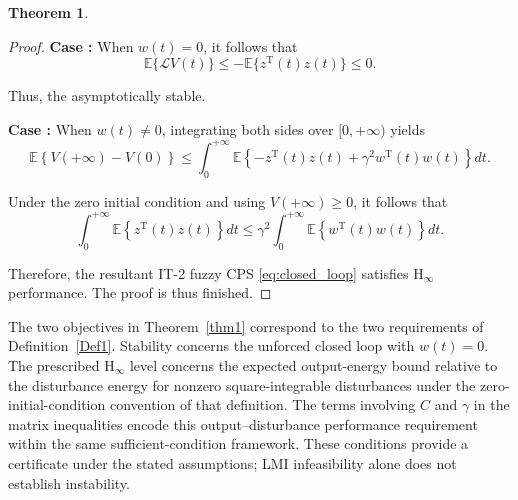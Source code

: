 \documentclass[preprint,review,fleqn,sort&compress,3p]{elsarticle}
\theoremstyle{definition} %
\theoremstyle{definition}%
\newtheorem{thm}{Theorem}[section]
\newif\ifreviewmarkup
\DeclareRobustCommand{\revdel}[1]{\ifreviewmarkup{\color{revisionred}\hypersetup{linkcolor=revisionred,citecolor=revisionred}#1}\fi}
\DeclareRobustCommand{\revadd}[1]{{\ifreviewmarkup\color{revisiongreen}\hypersetup{linkcolor=revisiongreen,citecolor=revisiongreen}\fi#1}}
\begin{document}
\begin{thm}
\begin{proof}
\textbf{Case \uppercase\expandafter{}:} When $w(t)=0$, it follows that
\begin{equation}
	\mathbb{E}\{\mathcal{L}V(t)\}
	\leq
	-\mathbb{E}\{z^{\mathrm{T}}(t)z(t)\}
	\leq 0.
\end{equation}

\label{rev:M31}Thus, the \revdel{closed-loop IT-2 fuzzy CPSs \eqref{eq:closed_loop} is} asymptotically stable.

\textbf{Case \uppercase\expandafter{}:} When $w(t)\neq0$, integrating both sides over $[0,+\infty)$ yields
\begin{equation}
	\mathbb{E}\left\{V(+\infty)-V(0)\right\}
	\leq
	\int_{0}^{+\infty}
	\mathbb{E}\left\{
	-z^{\mathrm{T}}(t)z(t)
	+\gamma^2 w^{\mathrm{T}}(t)w(t)
	\right\}dt.
\end{equation}

Under the zero initial condition and using $V(+\infty)\ge0$, it follows that
\begin{equation}
	\int_{0}^{+\infty}
	\mathbb{E}\left\{
	z^{\mathrm{T}}(t)z(t)
	\right\}dt
	\leq
	\gamma^2
	\int_{0}^{+\infty}
	\mathbb{E}\left\{
	w^{\mathrm{T}}(t)w(t)
	\right\}dt.
\end{equation}

Therefore, the resultant IT-2 fuzzy CPS \eqref{eq:closed_loop} satisfies $\mathrm{H}_\infty$ performance. The proof is thus finished.
\end{proof}
\end{thm}
\label{rev:M32}\revadd{The two objectives in Theorem~\ref{thm1} correspond to the two requirements of Definition~\ref{Def1}. Stability concerns the unforced closed loop with $w(t)=0$. The prescribed $\mathrm H_\infty$ level concerns the expected output-energy bound relative to the disturbance energy for nonzero square-integrable disturbances under the zero-initial-condition convention of that definition. The terms involving $C$ and $\gamma$ in the matrix inequalities encode this output--disturbance performance requirement within the same sufficient-condition framework. These conditions provide a certificate under the stated assumptions; LMI infeasibility alone does not establish instability.}
\end{document}
